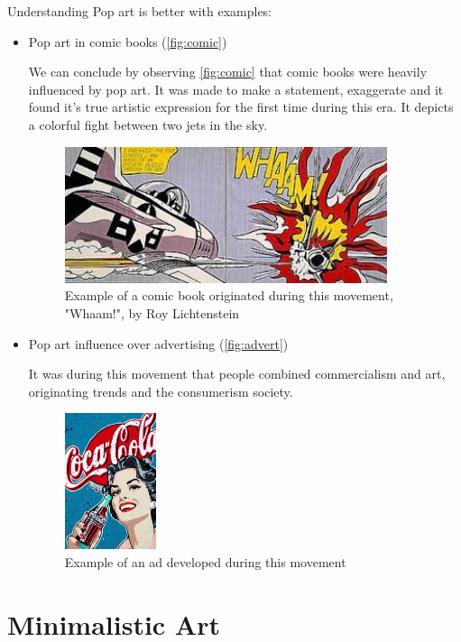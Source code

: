 \documentclass{report}
\begin{document}
Understanding Pop art is better with examples:
\begin{itemize}
	\item{Pop art in comic books} (\autoref{fig:comic})
	
We can conclude by observing \autoref{fig:comic} that comic books were heavily influenced by pop art. It was made to make a statement, exaggerate and it found it's true artistic expression for the first time during this era. It depicts a colorful fight between two jets in the sky.
	
	\begin{figure}[h]
	\center
	\includegraphics[height=4cm]{img/comic}
	\caption{Example of a comic book originated during this movement, "Whaam!", by Roy Lichtenstein}
	\label{fig:comic}
	\end{figure}	
	
	\item{Pop art influence over advertising} (\autoref{fig:advert})
	
It was during this movement that people combined commercialism and art, originating trends and the consumerism society.
	
	\begin{figure}[h]
	\center
	\includegraphics[height=4cm]{img/ad}
	\caption{Example of an ad developed during this movement}
	\label{fig:advert}
	\end{figure}	
		
\end{itemize}

\section{Minimalistic Art}
\end{document}

